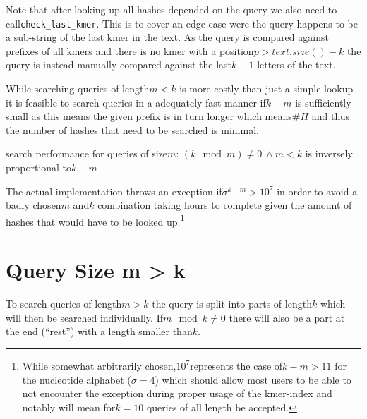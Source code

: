 Note that after looking up all hashes depended on the query we also
need to call\lstinline{check_last_kmer}. This is to cover an edge
case were the query happens to be a sub-string of the last kmer in
the text. As the query is compared against prefixes of all kmers and
there is no kmer with a position$p>text.size()-k$ the query is instead
manually compared against the last$k-1$ letters of the text.

While searching queries of length$m<k$ is more costly than just a
simple lookup it is feasible to search queries in a adequately fast
manner if$k-m$ is sufficiently small as this means the given prefix
is in turn longer which means$\#H$ and thus the number of hashes
that need to be searched is minimal.
\begin{lem}
\label{Lemma 2}search performance for queries of size$m:\,(k\mod m)\neq0\:\land m<k$
is inversely proportional to$k-m$
\end{lem}
The actual implementation throws an exception if$\sigma^{k-m}>10^{7}$
in order to avoid a badly chosen$m$ and$k$ combination taking hours
to complete given the amount of hashes that would have to be looked
up.\footnote{While somewhat arbitrarily chosen,$10^{7}$represents the case of$k-m>11$
for the nucleotide alphabet ($\sigma=4$) which should allow most
users to be able to not encounter the exception during proper usage
of the kmer-index and notably will mean for$k=10$ queries of all
length be accepted.}

\section{\label{section 3.3}Query Size m > k}

To search queries of length$m>k$ the query is split into parts of
length$k$ which will then be searched individually. If$m\mod k\neq0$
there will also be a part at the end (``rest'') with a length smaller
than$k$.

